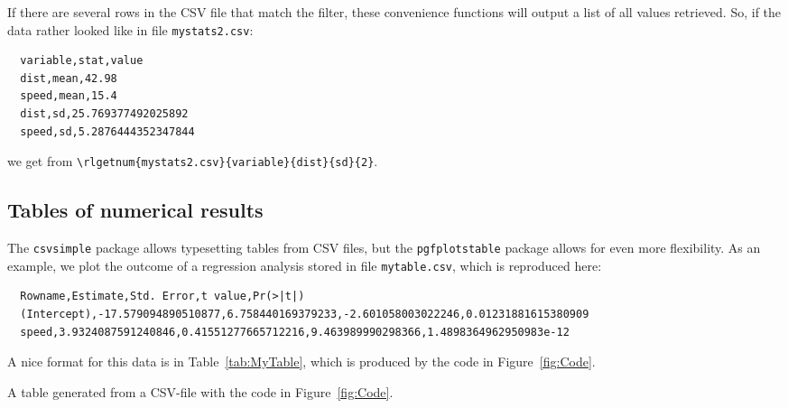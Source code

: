 \documentclass[fleqn,reqno,10pt]{article}
\newcommand{\datafoldername}{R_data_4_TeX}
\newcommand{\rlnum}[2]{\num[output-decimal-marker={.},
                             exponent-product = \cdot,
                             round-mode=places,
                             round-precision=#2,
                             group-digits=false]{#1}}
\newcommand{\rlgetnum}[5]{
  \csvreader[filter strcmp={\mykey}{#3},
             late after line = {{,}\ }, late after last line = {{}}]
            {\datafoldername/#1}{#2=\mykey,#4=\myvalue}{\rlnum{\myvalue}{#5}}}
\begin{document}
If there are several rows in the CSV file that match the filter, these convenience functions
will output a list of all values retrieved. So, if the data rather looked like in file
\texttt{mystats2.csv}:
\begin{verbatim}
  variable,stat,value        
  dist,mean,42.98            
  speed,mean,15.4            
  dist,sd,25.769377492025892 
  speed,sd,5.2876444352347844
\end{verbatim}
we get \rlgetnum{mystats2.csv}{variable}{dist}{sd}{2} from \verb|\rlgetnum{mystats2.csv}{variable}{dist}{sd}{2}|. 

\subsection*{Tables of numerical results}

The \texttt{csvsimple} package allows typesetting tables from CSV files, but the
\texttt{pgfplotstable} package allows for even more flexibility. As an example, we plot the
outcome of a regression analysis stored in file \texttt{mytable.csv}, which is reproduced here:
\begin{verbatim}
  Rowname,Estimate,Std. Error,t value,Pr(>|t|)                                         
  (Intercept),-17.579094890510877,6.758440169379233,-2.601058003022246,0.01231881615380909
  speed,3.9324087591240846,0.41551277665712216,9.463989990298366,1.4898364962950983e-12
\end{verbatim}
A nice format for this data is in Table~\ref{tab:MyTable}, which is produced by the code in Figure~\ref{fig:Code}.

\begin{center}
  \begin{table}[h]
    \centering


    \caption{A table generated from a CSV-file with the code in Figure~\ref{fig:Code}.}
    \label{tab:MyTable}
  \end{table}
\end{center}
\end{document}
